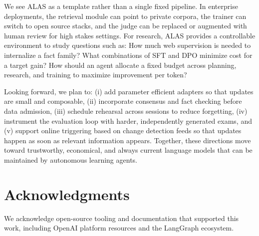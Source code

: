 \documentclass[11pt]{article}
\begin{document}
We see ALAS as a template rather than a single fixed pipeline. In enterprise deployments, the retrieval module can point to private corpora, the trainer can switch to open source stacks, and the judge can be replaced or augmented with human review for high stakes settings. For research, ALAS provides a controllable environment to study questions such as: How much web supervision is needed to internalize a fact family? What combinations of SFT and DPO minimize cost for a target gain? How should an agent allocate a fixed budget across planning, research, and training to maximize improvement per token?

Looking forward, we plan to: (i) add parameter efficient adapters so that updates are small and composable, (ii) incorporate consensus and fact checking before data admission, (iii) schedule rehearsal across sessions to reduce forgetting, (iv) instrument the evaluation loop with harder, independently generated exams, and (v) support online triggering based on change detection feeds so that updates happen as soon as relevant information appears. Together, these directions move toward trustworthy, economical, and always current language models that can be maintained by autonomous learning agents.

\section*{Acknowledgments}
We acknowledge open-source tooling and documentation that supported this work, including OpenAI platform resources and the LangGraph ecosystem.



\end{document}
